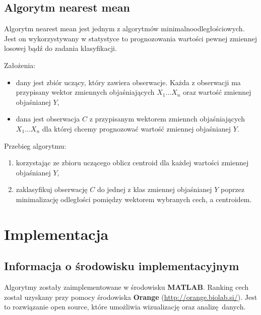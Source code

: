 \documentclass[11pt, a4paper, titlepage]{report}
\begin{document}
\section{Algorytm nearest mean}
\label{sec:Algorytm nearest mean}
Algorytm nearest mean jest jednym z algorytmów minimalnoodległościowych. Jest on wykorzystywany w statystyce to prognozowania wartości pewnej zmiennej losowej bądź do zadania klasyfikacji.

Założenia:
\begin{itemize}
  \item dany jest zbiór uczący, który zawiera obserwacje. Każda z obserwacji ma przypisany wektor zmiennych objaśniających $X_1...X_n$ oraz wartość zmiennej objaśnianej $Y$,
  \item dana jest obserwacja $C$ z przypisanym wektorem zmiennch objaśniających $X_1...X_n$ dla której chcemy prognozować wartość zmiennej objaśnianej $Y$.
\end{itemize}

Przebieg algorytmu:
\begin{enumerate}
  \item korzystając ze zbioru uczącego oblicz centroid dla każdej wartości zmiennej objaśnianej $Y$,
  \item zaklasyfikuj obserwację $C$ do jednej z klas zmiennej objaśnianej $Y$ poprzez minimalizację odległości pomiędzy wektorem wybranych cech, a centroidem.
\end{enumerate}

\chapter{Implementacja}
\label{chap:Implementacja}
\section{Informacja o środowisku implementacyjnym}
\label{sec:Informacja o środowisku implementacyjnym}
Algorytmy zostały zaimplementowane w środowisku \textbf{MATLAB}. Ranking cech został uzyskany przy pomocy środowiska \textbf{Orange} (\url{http://orange.biolab.si/}). Jest to rozwiązanie open source, które umożliwia wizualizację oraz analizę~danych.
\end{document}
